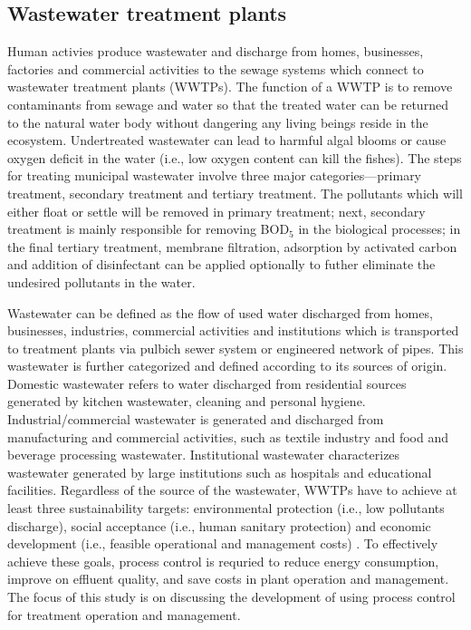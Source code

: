 \subsection{Wastewater treatment plants}
Human activies produce wastewater and discharge from homes, businesses, factories and commercial activities to the sewage systems which connect to wastewater treatment plants (WWTPs). The function of a WWTP is to remove contaminants from sewage and water so that the treated water can be returned to the natural water body without dangering any living beings reside in the ecosystem. Undertreated wastewater can lead to harmful algal blooms or cause oxygen deficit in the water (i.e., low oxygen content can kill the fishes). The steps for treating municipal wastewater involve three major categories---primary treatment, secondary treatment and tertiary treatment. The pollutants which will either float or settle will be removed in primary treatment; next, secondary treatment is mainly responsible for removing BOD$_5$ in the biological processes; in the final tertiary treatment, membrane filtration, adsorption by activated carbon and addition of disinfectant can be applied optionally to futher eliminate the undesired pollutants in the water.

Wastewater can be defined as the flow of used water discharged from homes, businesses, industries, commercial activities and institutions which is transported to treatment plants via pulbich sewer system or engineered network of pipes. This wastewater is further categorized and defined according to its sources of origin. Domestic wastewater refers to water discharged from residential sources generated by kitchen wastewater, cleaning and personal hygiene. Industrial/commercial wastewater is generated and discharged from manufacturing and commercial activities, such as textile industry and food and beverage processing wastewater. Institutional wastewater characterizes wastewater generated by large institutions such as hospitals and educational facilities. Regardless of the source of the wastewater, WWTPs have to achieve at least three sustainability targets: environmental protection (i.e., low pollutants discharge), social acceptance (i.e., human sanitary protection) and economic development (i.e., feasible operational and management costs) \citep{manninaDecisionSupportSystems2019}. To effectively achieve these goals, process control is requried to reduce energy consumption, improve on effluent quality, and save costs in plant operation and management. The focus of this study is on discussing the development of using process control for treatment operation and management.

